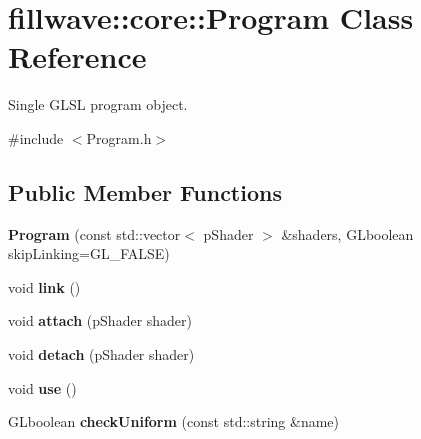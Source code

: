 \hypertarget{classfillwave_1_1core_1_1Program}{}\section{fillwave\+:\+:core\+:\+:Program Class Reference}
\label{classfillwave_1_1core_1_1Program}


Single G\+L\+S\+L program object.  




{\ttfamily \#include $<$Program.\+h$>$}

\subsection*{Public Member Functions}
\begin{DoxyCompactItemize}
\item 
\hypertarget{classfillwave_1_1core_1_1Program_a898aaa612c59cf431bdff562aa191c22}{}{\bfseries Program} (const std\+::vector$<$ p\+Shader $>$ \&shaders, G\+Lboolean skip\+Linking=G\+L\+\_\+\+F\+A\+L\+S\+E)\label{classfillwave_1_1core_1_1Program_a898aaa612c59cf431bdff562aa191c22}

\item 
\hypertarget{classfillwave_1_1core_1_1Program_a1790ef9a0f7abf5d3dcba6e3ce191f50}{}void {\bfseries link} ()\label{classfillwave_1_1core_1_1Program_a1790ef9a0f7abf5d3dcba6e3ce191f50}

\item 
\hypertarget{classfillwave_1_1core_1_1Program_ab167c340191ec67980ff36b7417055b6}{}void {\bfseries attach} (p\+Shader shader)\label{classfillwave_1_1core_1_1Program_ab167c340191ec67980ff36b7417055b6}

\item 
\hypertarget{classfillwave_1_1core_1_1Program_ac25f7b0664e9846c8aaa1346b58710c1}{}void {\bfseries detach} (p\+Shader shader)\label{classfillwave_1_1core_1_1Program_ac25f7b0664e9846c8aaa1346b58710c1}

\item 
\hypertarget{classfillwave_1_1core_1_1Program_ab435929774fd369e606755fcc3b14c5d}{}void {\bfseries use} ()\label{classfillwave_1_1core_1_1Program_ab435929774fd369e606755fcc3b14c5d}

\item 
\hypertarget{classfillwave_1_1core_1_1Program_a328d2854256bb8cf91544956613cd2e9}{}G\+Lboolean {\bfseries check\+Uniform} (const std\+::string \&name)\label{classfillwave_1_1core_1_1Program_a328d2854256bb8cf91544956613cd2e9}


\end{DoxyCompactItemize}
